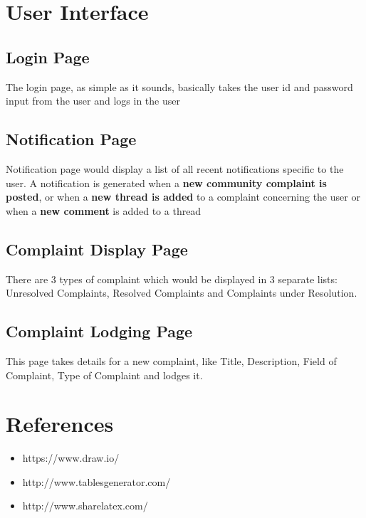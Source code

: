 \documentclass{article}
\begin{document}
\section{User Interface}
    \begin{addmargin}[1em]{2em}

        \subsection{Login Page}
        The login page, as simple as it sounds, basically takes the user id and password input from the user and logs in the user
    \end{addmargin}
    \begin{addmargin}[1em]{2em}
            
        \subsection{Notification Page}
        Notification page would display a list of all recent notifications specific to the user. A notification is generated when a \textbf{new community complaint is posted}, or when a \textbf{new thread is added} to a complaint concerning the user or when a \textbf{new comment} is added to a thread
        
    \end{addmargin}
    \begin{addmargin}[1em]{2em}
        
        \subsection{Complaint Display Page}
        There are 3 types of complaint which would be displayed in 3 separate lists: Unresolved Complaints, Resolved Complaints and Complaints under Resolution.
        
    \end{addmargin}
    \begin{addmargin}[1em]{2em}
        
        \subsection{Complaint Lodging Page}
        This page takes details for a new complaint, like Title, Description, Field of Complaint, Type of Complaint and lodges it.
    \end{addmargin}
\section{References}
    \begin{itemize}
        \item https://www.draw.io/
        \item http://www.tablesgenerator.com/
        \item http://www.sharelatex.com/
    \end{itemize}
\end{document}
